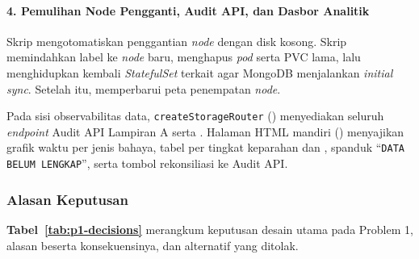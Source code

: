 \paragraph*{4. Pemulihan Node Pengganti, Audit API, dan Dasbor Analitik}
Skrip  mengotomatiskan penggantian \textit{node} dengan disk kosong. Skrip memindahkan label  ke \textit{node} baru, menghapus \textit{pod} serta PVC lama, lalu menghidupkan kembali \textit{StatefulSet} terkait agar MongoDB menjalankan \textit{initial sync}. Setelah itu,  memperbarui peta penempatan \textit{node}.

Pada sisi observabilitas data, \texttt{createStorageRouter} () menyediakan seluruh \textit{endpoint} Audit API Lampiran A serta . Halaman HTML mandiri  () menyajikan grafik waktu per jenis bahaya, tabel per tingkat keparahan dan , spanduk ``\texttt{DATA BELUM LENGKAP}'', serta tombol rekonsiliasi ke Audit API.

\subsubsection{Alasan Keputusan}

\textbf{Tabel~\ref{tab:p1-decisions}} merangkum keputusan desain utama pada Problem 1, alasan beserta konsekuensinya, dan alternatif yang ditolak.

